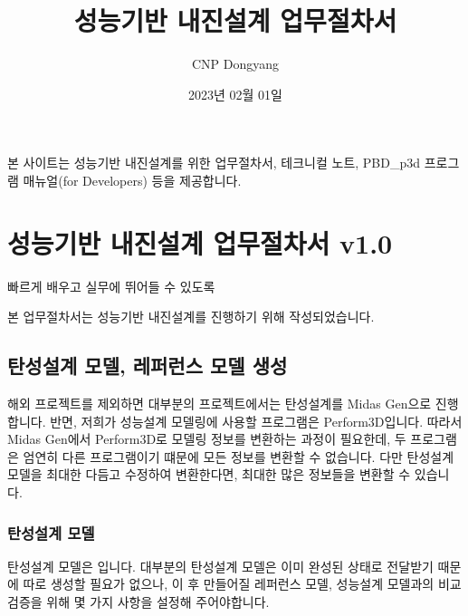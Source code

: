 \documentclass[a4paper,10pt,korean]{sphinxmanual}
\title{성능기반 내진설계 업무절차서}
\date{2023년 02월 01일}
\author{CNP Dongyang}
\begin{document}
\pagestyle{empty}
\sphinxmaketitle
\pagestyle{plain}
\sphinxtableofcontents
\pagestyle{normal}
\label{\detokenize{index::doc}}


\sphinxAtStartPar
본 사이트는 성능기반 내진설계를 위한 업무절차서, 테크니컬 노트, PBD\_p3d 프로그램 매뉴얼(for Developers) 등을 제공합니다.

\sphinxstepscope


\chapter{성능기반 내진설계 업무절차서 v1.0}
\label{\detokenize{0_pbd_p3d_manual:v1-0}}\label{\detokenize{0_pbd_p3d_manual::doc}}
\sphinxAtStartPar
빠르게 배우고 실무에 뛰어들 수 있도록

\sphinxAtStartPar
본 업무절차서는 성능기반 내진설계를  진행하기 위해 작성되었습니다.

\sphinxstepscope


\section{탄성설계 모델, 레퍼런스 모델 생성}
\label{\detokenize{1_ref_model:id1}}\label{\detokenize{1_ref_model::doc}}
\sphinxAtStartPar
{}

\sphinxAtStartPar
해외 프로젝트를 제외하면 대부분의 프로젝트에서는 탄성설계를 Midas Gen으로 진행합니다. 반면, 저희가 성능설계 모델링에 사용할 프로그램은 Perform\sphinxhyphen{}3D입니다.
따라서 Midas Gen에서 Perform\sphinxhyphen{}3D로 모델링 정보를 변환하는 과정이 필요한데, 두 프로그램은 엄연히 다른 프로그램이기 떄문에 모든 정보를 변환할 수 없습니다.
다만 탄성설계 모델을 최대한 다듬고 수정하여 변환한다면, 최대한 많은 정보들을 변환할 수 있습니다.

\begin{figure}[htbp]
\centering
\capstart

\noindent{}
\caption{}\label{\detokenize{1_ref_model:id5}}\end{figure}


\subsection{탄성설계 모델}
\label{\detokenize{1_ref_model:id2}}
\sphinxAtStartPar
탄성설계 모델은  입니다.
대부분의 탄성설계 모델은 이미 완성된 상태로 전달받기 때문에 따로 생성할 필요가 없으나,
이 후 만들어질 레퍼런스 모델, 성능설계 모델과의 비교 검증을 위해 몇 가지 사항을 설정해 주어야합니다.
\end{document}
